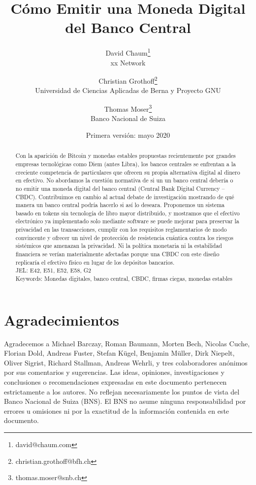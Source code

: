\documentclass[10pt,spanish]{article}
\begin{document}
\title{Cómo Emitir una Moneda Digital del Banco Central}
\author{David Chaum\footnote{david@chaum.com} \\
  xx Network \and
  Christian Grothoff\footnote{christian.grothoff@bfh.ch} \\
  Universidad de Ciencias Aplicadas de Berna y Proyecto GNU \and
  Thomas Moser\footnote{thomas.moser@snb.ch}\\
  Banco Nacional de Suiza}
\date{Primera versión: mayo 2020}
\maketitle

\renewcommand{\abstractname}{Resumen}
\renewcommand{\refname}{Referencias}

\begin{abstract}%
Con la aparición de Bitcoin y monedas estables propuestas recientemente
por grandes empresas tecnológicas como Diem (antes Libra), los bancos
centrales se enfrentan a la creciente competencia de particulares que
ofrecen su propia alternativa digital al dinero en efectivo. No
abordamos la cuestión normativa de si un un banco central debería o no
emitir una moneda digital del banco central (Central Bank Digital
Currency -- CBDC). Contribuimos en cambio al actual debate de
investigación mostrando de qué manera un banco central podría hacerlo si
así lo deseara. Proponemos un sistema basado en tokens sin tecnología de
libro mayor distribuido, y mostramos que el efectivo electrónico ya
implementado solo mediante software se puede mejorar para preservar la
privacidad en las transacciones, cumplir con los requisitos
reglamentarios de modo convincente y ofrecer un nivel de protección de
resistencia cuántica contra los riesgos sistémicos que amenazan la
privacidad. Ni la política monetaria ni la estabilidad financiera se
verían materialmente afectadas porque una CBDC con este diseño
replicaría el efectivo físico en lugar de los depósitos bancarios. \\
JEL: E42, E51, E52, E58, G2
\\
Keywords: Monedas digitales, banco central, CBDC, firmas ciegas, monedas
estables
\end{abstract}
\vspace{20pt}
\vspace{20pt}


\section*{Agradecimientos}
Agradecemos a Michael Barczay, Roman Baumann, Morten Bech, Nicolas Cuche,
Florian Dold, Andreas Fuster, Stefan Kügel, Benjamin Müller, Dirk Niepelt,
Oliver Sigrist, Richard Stallman, Andreas Wehrli, y tres colaboradores
anónimos por sus comentarios y sugerencias. Las ideas, opiniones,
investigaciones y conclusiones o recomendaciones expresadas en este
documento pertenecen estrictamente a los autores. No reflejan
necesariamente los puntos de vista del Banco Nacional de Suiza (BNS). El
BNS no asume ninguna responsabilidad por errores u omisiones ni por la
exactitud de la información contenida en este documento.
\end{document}
